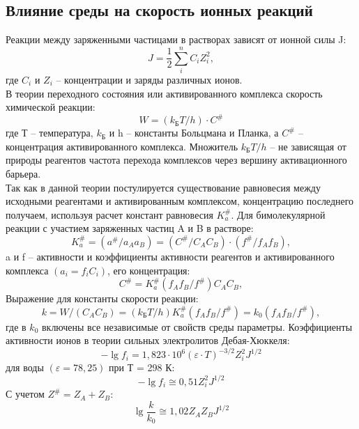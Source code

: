 \documentclass[a4paper, 12pt]{article}
\begin{document}
\subsection{Влияние среды на скорость ионных реакций}
Реакции между заряженными частицами в растворах зависят от ионной силы J:
\begin{equation}
J = \frac{1}{2} \sum_i^n C_{i} Z_{i}^{2},
\end{equation}
где  $C_{i}$ и $Z_{i}$ -- концентрации и заряды различных ионов.\\
В теории переходного состояния или активированного комплекса скорость
химической реакции:
\begin{equation}
W = (k_{\text{Б}}T/h)\cdot C^{\#}
\end{equation}
где Т -- температура, $k_{\text{Б}}$ и h -- константы Больцмана и Планка, а $C^{\#}$ -- концентрация активированного комплекса. Множитель $k_{\text{Б}}T/h$ -- не зависящая от природы реагентов частота перехода комплексов через вершину активационного барьера.\\
Так как в данной теории постулируется существование равновесия между
исходными реагентами и активированным комплексом, концентрацию последнего
получаем, используя расчет констант
равновесия $K_{a}^{\#}$. Для бимолекулярной реакции с участием заряженных частиц A и B в растворе:
\begin{equation}
K_{a}^{\#} = (a^{\#}/a_{A}a_{B}) = (C^{\#}/C_{A}C_{B})\cdot (f^{\#}/f_{A}f_{B}),
\end{equation}
a и f -- активности и коэффициенты активности реагентов
и активированного комплекса $(a_{i} = f_{i}C_{i})$, его концентрация:
\begin{equation}
C^{\#} = K_{a}^{\#}(f_{A}f_{B}/f^{\#})C_{A}C_{B},
\end{equation}
Выражение для константы скорости реакции:
\begin{equation}
k = W/(C_{A}C_{B}) = (k_{\text{Б}}T/h)K_{a}^{\#}(f_{A}f_{B}/f^{\#}) = k_{0}(f_{A}f_{B}/f^{\#}),
\end{equation}
где в $k_{0}$ включены все независимые от свойств среды параметры.
Коэффициенты активности ионов в теории сильных электролитов
Дебая-Хюккеля:
\begin{equation}
-\lg f_{i} = 1,823\cdot 10^{6} (\varepsilon \cdot T)^{-3/2}Z_{i}^{2}J^{1/2}
\end{equation}
для воды $(\varepsilon = 78,25)$ при Т = 298 К:
\begin{equation}
-\lg f_{i} \cong 0,51 Z_{i}^{2}J^{1/2}
\end{equation}
С учетом $Z^{\#} = Z_{A} + Z_{B}$:
\begin{equation}
\lg \frac{k}{k_{0}} \cong 1,02 Z_{A}Z_{B}J^{1/2}
\end{equation}
\end{document}

